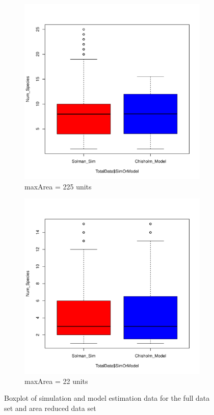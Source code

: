 \documentclass{article}
\begin{document}
\begin{figure}[h!]
  \centering
  \begin{subfigure}[b]{0.4\linewidth}
    \includegraphics[width=\linewidth]{../../Results/Simulation/SolmanChisholmBoxplot_1.pdf}
    \caption{maxArea = 225 units}
  \end{subfigure}
  \begin{subfigure}[b]{0.4\linewidth}
    \includegraphics[width=\linewidth]{../../Results/Simulation/SolmanChisholmBoxplot_10.pdf}
    \caption{maxArea = 22 units}
  \end{subfigure}
  \caption{Boxplot of simulation and model estimation data for the full data set and area reduced data set}
  \label{fig:boxplots}
\end{figure}
\end{document}
